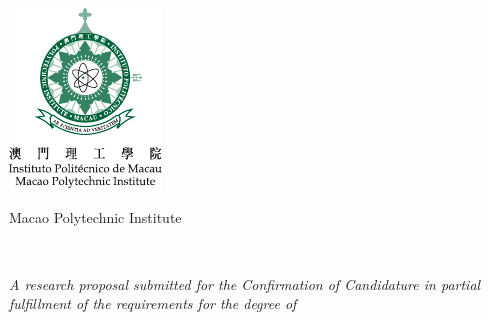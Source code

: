 \begin{center}
	\includegraphics[width=0.25\linewidth]{MPI.pdf}

	\vspace*{0.5in}

	{\huge Macao Polytechnic Institute}

	\vspace*{0.75in}

	{\LARGE \AcademicUnit}

	\vspace*{0.75in}

	{\Large \@title}

	\vspace*{0.75in}

	\large
	\@author\\
	\StudentNumber

	\vspace*{0.75in}
		
	{\it A research proposal submitted for the Confirmation of Candidature in partial fulfillment of the requirements for the degree of\\\Programme}
		
	\vfill

	\the\year
\end{center}